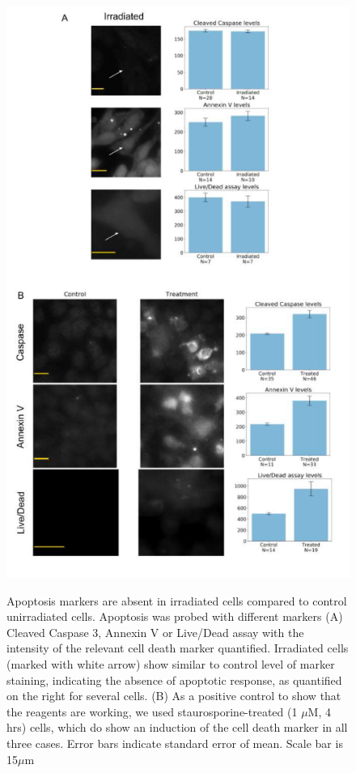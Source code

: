 \begin{figure}[H]
    {\hfill\includegraphics[clip,width=0.8\linewidth]{figures/apoptosis.png}\hspace*{\fill}}
    \caption{Apoptosis markers are absent in irradiated cells compared to control unirradiated cells. Apoptosis was probed with different markers (A) Cleaved Caspase 3, Annexin V or Live/Dead assay with the intensity of the relevant cell death marker quantified. Irradiated cells (marked with white arrow) show similar to control level of marker staining, indicating the
    absence of apoptotic response, as quantified on the right for several cells. (B) As a positive control to show that the reagents are working, we used staurosporine-treated (1 $\mu$M, 4 hrs) cells, which do show an induction of the cell death marker in all three cases. Error bars indicate standard error of mean. Scale bar is 15$\mu$m}
    {\label{fig:apoptosis}}
\end{figure}


